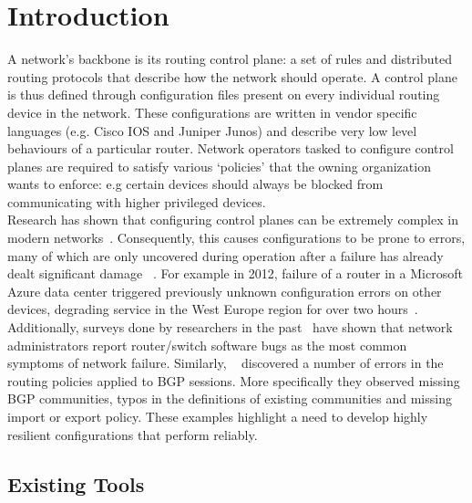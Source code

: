 \documentclass[../thesis.tex]{subfiles}
\begin{document}
\chapter{Introduction}
\label{ch:intro}

A network's backbone is its routing control plane: a set of rules and distributed routing protocols that describe how the network should operate. A control plane is thus defined through configuration files present on every individual routing device in the network. These configurations are written in vendor specific languages (e.g. Cisco IOS and Juniper Junos) and describe very low level behaviours of a particular router. Network operators tasked to configure control planes are required to satisfy various `policies' that the owning organization wants to enforce: e.g certain devices should always be blocked from communicating with higher privileged devices.\\

Research has shown that configuring control planes can be extremely complex in modern networks~\cite{complexity}. Consequently, this causes configurations to be prone to errors, many of which are only uncovered during operation after a failure has already dealt significant damage ~\cite{errors}. For example in 2012, failure of a router in a Microsoft Azure data center triggered previously unknown configuration errors on other devices, degrading service in the West Europe region for over two hours~\cite{azure}. Additionally, surveys done by researchers in the past~\cite{Zeng} have shown that network administrators report router/switch software bugs as the most common symptoms of network failure. Similarly, ~\cite{Lee} discovered a number of errors in the routing policies applied to BGP sessions. More specifically they observed missing BGP communities, typos in the definitions of existing communities and missing import or export policy. These examples highlight a need to develop highly resilient configurations that perform reliably.\\  


\section{Existing Tools}
\end{document}
